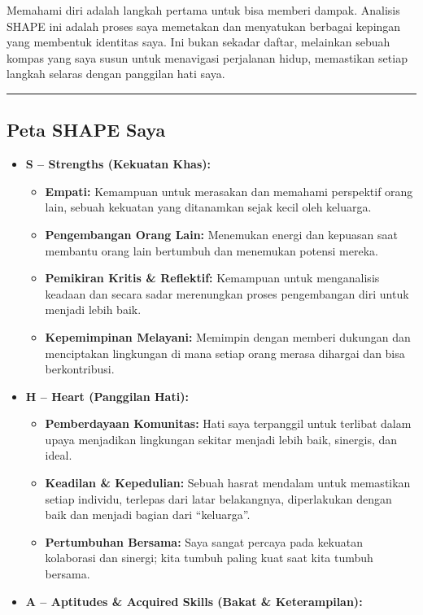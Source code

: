 \documentclass[
  letterpaper,
  DIV=11,
  numbers=noendperiod]{scrreprt}
\providecommand{\tightlist}{%
  \setlength{\itemsep}{0pt}\setlength{\parskip}{0pt}}
\begin{document}
Memahami diri adalah langkah pertama untuk bisa memberi dampak. Analisis
SHAPE ini adalah proses saya memetakan dan menyatukan berbagai kepingan
yang membentuk identitas saya. Ini bukan sekadar daftar, melainkan
sebuah kompas yang saya susun untuk menavigasi perjalanan hidup,
memastikan setiap langkah selaras dengan panggilan hati saya.

\begin{center}\rule{0.5\linewidth}{0.5pt}\end{center}

\subsection{Peta SHAPE Saya}\label{peta-shape-saya}

\begin{itemize}
\tightlist
\item
  \textbf{S -- Strengths (Kekuatan Khas):}

  \begin{itemize}
  \tightlist
  \item
    \textbf{Empati:} Kemampuan untuk merasakan dan memahami perspektif
    orang lain, sebuah kekuatan yang ditanamkan sejak kecil oleh
    keluarga.
  \item
    \textbf{Pengembangan Orang Lain:} Menemukan energi dan kepuasan saat
    membantu orang lain bertumbuh dan menemukan potensi mereka.
  \item
    \textbf{Pemikiran Kritis \& Reflektif:} Kemampuan untuk menganalisis
    keadaan dan secara sadar merenungkan proses pengembangan diri untuk
    menjadi lebih baik.
  \item
    \textbf{Kepemimpinan Melayani:} Memimpin dengan memberi dukungan dan
    menciptakan lingkungan di mana setiap orang merasa dihargai dan bisa
    berkontribusi.
  \end{itemize}
\item
  \textbf{H -- Heart (Panggilan Hati):}

  \begin{itemize}
  \tightlist
  \item
    \textbf{Pemberdayaan Komunitas:} Hati saya terpanggil untuk terlibat
    dalam upaya menjadikan lingkungan sekitar menjadi lebih baik,
    sinergis, dan ideal.
  \item
    \textbf{Keadilan \& Kepedulian:} Sebuah hasrat mendalam untuk
    memastikan setiap individu, terlepas dari latar belakangnya,
    diperlakukan dengan baik dan menjadi bagian dari ``keluarga''.
  \item
    \textbf{Pertumbuhan Bersama:} Saya sangat percaya pada kekuatan
    kolaborasi dan sinergi; kita tumbuh paling kuat saat kita tumbuh
    bersama.
  \end{itemize}
\item
  \textbf{A -- Aptitudes \& Acquired Skills (Bakat \& Keterampilan):}


\end{itemize}
\end{document}
